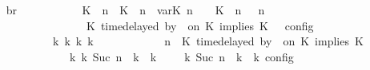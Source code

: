 \begin{isabellebody}
\ \isamarkupfalse%
\ br{}{\isacharprime}{\isacharcolon}\isanewline
\ \ \ \ \ \ \ \ {\isacartoucheopen}{\isasymrho}\ {\isasymin}\ {\isasymlbrakk}\ {\isacharparenleft}{\isacharparenleft}K\ {\isasymUp}\ n{\isacharparenright}\ {\isacharhash}\ {\isacharparenleft}K\ {\isasymDown}\ n\ {\isacharat}{\isasymsharp}\ {\isasymlparr}{\isasymtau}\isactrlsub v\isactrlsub a\isactrlsub r{\isacharparenleft}K\ n{\isacharparenright}\ {\isasymoplus}\ {\isasymdelta}{\isasymtau}{\isasymrparr}{\isacharparenright}\ {\isacharhash}\ {\isacharparenleft}K\ {\isasymUp}\ n{\isacharparenright}\ {\isacharhash}\ {\isasymGamma}{\isacharparenright}{\isacharcomma}\ n\isanewline
\ \ \ \ \ \ \ \ \ \ \ \ \ \ {\isasymturnstile}\ {\isasymPsi}\ {\isasymtriangleright}\ {\isacharparenleft}{\isacharparenleft}K\ time{\isacharminus}delayed{\isasymsharp}\ by\ {\isasymdelta}{\isasymtau}\ on\ K\ implies\ K\ {\isacharhash}\ {\isasymPhi}{\isacharparenright}\ {\isasymrbrakk}\isactrlsub c\isactrlsub o\isactrlsub n\isactrlsub f\isactrlsub i\isactrlsub g\isanewline
\ \ \ \ \ \ \ \ \ \ {\isasymLongrightarrow}\ {\isasymexists}{\isasymGamma}\isactrlsub k\ {\isasymPsi}\isactrlsub k\ {\isasymPhi}\isactrlsub k\ k{\isachardot}\isanewline
\ \ \ \ \ \ \ \ \ \ \ {\isacharparenleft}{\isacharparenleft}{\isasymGamma}{\isacharcomma}\ n\ {\isasymturnstile}\ {\isacharparenleft}{\isacharparenleft}K\ time{\isacharminus}delayed{\isasymsharp}\ by\ {\isasymdelta}{\isasymtau}\ on\ K\ implies\ K\ {\isacharhash}\ {\isasymPsi}{\isacharparenright}\ {\isasymtriangleright}\ {\isasymPhi}{\isacharparenright}\isanewline
\ \ \ \ \ \ \ \ \ \ \ \ \ \ {\isasymhookrightarrow}\isactrlbsup k\isactrlesup \ {\isacharparenleft}{\isasymGamma}\isactrlsub k{\isacharcomma}\ Suc\ n\ {\isasymturnstile}\ {\isasymPsi}\isactrlsub k\ {\isasymtriangleright}\ {\isasymPhi}\isactrlsub k{\isacharparenright}{\isacharparenright}\ {\isasymand}\ {\isasymrho}\ {\isasymin}\ {\isasymlbrakk}\ {\isasymGamma}\isactrlsub k{\isacharcomma}\ Suc\ n\ {\isasymturnstile}\ {\isasymPsi}\isactrlsub k\ {\isasymtriangleright}\ {\isasymPhi}\isactrlsub k\ {\isasymrbrakk}\isactrlsub c\isactrlsub o\isactrlsub n\isactrlsub f\isactrlsub i\isactrlsub g{\isacartoucheclose}\isanewline
\ \ \ \ \ \ \ \ \isamarkupfalse%
\ {\isacharminus}\isanewline

\end{isabellebody}
